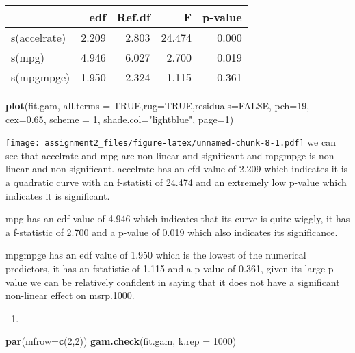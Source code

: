 \documentclass[]{article}
\newenvironment{Shaded}{\begin{snugshade}}{\end{snugshade}}
\newcommand{\DataTypeTok}[1]{\textcolor[rgb]{0.13,0.29,0.53}{#1}}
\newcommand{\DecValTok}[1]{\textcolor[rgb]{0.00,0.00,0.81}{#1}}
\newcommand{\FloatTok}[1]{\textcolor[rgb]{0.00,0.00,0.81}{#1}}
\newcommand{\KeywordTok}[1]{\textcolor[rgb]{0.13,0.29,0.53}{\textbf{#1}}}
\newcommand{\NormalTok}[1]{#1}
\newcommand{\OtherTok}[1]{\textcolor[rgb]{0.56,0.35,0.01}{#1}}
\newcommand{\StringTok}[1]{\textcolor[rgb]{0.31,0.60,0.02}{#1}}
\begin{document}
\begin{table}[H]
\centering
\begin{tabular}{lrrrr}
\toprule
  & edf & Ref.df & F & p-value\\
\midrule
s(accelrate) & 2.209 & 2.803 & 24.474 & 0.000\\
s(mpg) & 4.946 & 6.027 & 2.700 & 0.019\\
s(mpgmpge) & 1.950 & 2.324 & 1.115 & 0.361\\
\bottomrule
\end{tabular}
\end{table}

\begin{Shaded}
\begin{Highlighting}[]
\KeywordTok{plot}\NormalTok{(fit.gam, }\DataTypeTok{all.terms =} \OtherTok{TRUE}\NormalTok{,}\DataTypeTok{rug=}\OtherTok{TRUE}\NormalTok{,}\DataTypeTok{residuals=}\OtherTok{FALSE}\NormalTok{,}
     \DataTypeTok{pch=}\DecValTok{19}\NormalTok{, }\DataTypeTok{cex=}\FloatTok{0.65}\NormalTok{, }\DataTypeTok{scheme =} \DecValTok{1}\NormalTok{, }\DataTypeTok{shade.col=}\StringTok{"lightblue"}\NormalTok{, }\DataTypeTok{page=}\DecValTok{1}\NormalTok{)}
\end{Highlighting}
\end{Shaded}

\texttt{[image: assignment2\_files/figure-latex/unnamed-chunk-8-1.pdf]}
we can see that accelrate and mpg are non-linear and significant and
mpgmpge is non-linear and non significant. accelrate has an efd value of
2.209 which indicates it is a quadratic curve with an f-statisti of
24.474 and an extremely low p-value which indicates it is significant.

mpg has an edf value of 4.946 which indicates that its curve is quite
wiggly, it has a f-statistic of 2.700 and a p-value of 0.019 which also
indicates its significance.

mpgmpge has an edf value of 1.950 which is the lowest of the numerical
predictors, it has an fstatistic of 1.115 and a p-value of 0.361, given
its large p-value we can be relatively confident in saying that it does
not have a significant non-linear effect on msrp.1000.

\begin{enumerate}
\def\labelenumi{\alph{enumi})}
\setcounter{enumi}{6}
\item
\end{enumerate}

\begin{Shaded}
\begin{Highlighting}[]
\KeywordTok{par}\NormalTok{(}\DataTypeTok{mfrow=}\KeywordTok{c}\NormalTok{(}\DecValTok{2}\NormalTok{,}\DecValTok{2}\NormalTok{))}
\KeywordTok{gam.check}\NormalTok{(fit.gam, }\DataTypeTok{k.rep =} \DecValTok{1000}\NormalTok{)}
\end{Highlighting}
\end{Shaded}
\end{document}
